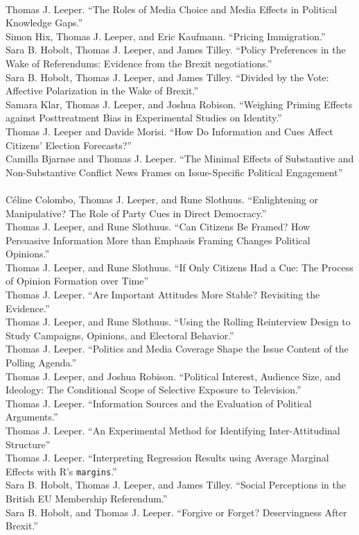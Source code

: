 \documentclass[12pt]{article}
\renewcommand{\section}[1]{\pagebreak[3]%
    \llap{\scshape\smash{\parbox[t]{\marginparwidth}{\raggedright {\color{lg}#1}}}}%
    \vspace{-\baselineskip}\par}
\newcommand{\topic}[1]{\pagebreak[3]\indent {\color{lg}{\footnotesize #1 }}\\}
\newcommand{\entry}[1]{\indent {\color{lg}\guillemotright}\hspace{2pt}#1\vspace{.25em}\\}
\begin{document}
\section{Working Papers\\ \& Ongoing Projects}
\topic{Papers Under Review}
	\entry{Thomas J. Leeper. ``The Roles of Media Choice and Media Effects in Political Knowledge Gaps.''}
    \entry{Simon Hix, Thomas J. Leeper, and Eric Kaufmann. ``Pricing Immigration.''}
    \entry{Sara B. Hobolt, Thomas J. Leeper, and James Tilley. ``Policy Preferences in the Wake of Referendums: Evidence from the Brexit negotiations.''}
    \entry{Sara B. Hobolt, Thomas J. Leeper, and James Tilley. ``Divided by the Vote: Affective Polarization in the Wake of Brexit.''}
    \entry{Samara Klar, Thomas J. Leeper, and Joshua Robison. ``Weighing Priming Effects against Posttreatment Bias in Experimental Studies on Identity.''}
	\entry{Thomas J. Leeper and Davide Morisi. ``How Do Information and Cues Affect Citizens' Election Forecasts?''}
    \entry{Camilla Bjarn{\o}e and Thomas J. Leeper. ``The Minimal Effects of Substantive and Non-Substantive Conflict News Frames on Issue-Specific Political Engagement''}

\topic{Working Papers}
	\entry{C\'{e}line Colombo, Thomas J. Leeper, and Rune Slothuus. ``Enlightening or Manipulative? The Role of Party Cues in Direct Democracy.''}
	\entry{Thomas J. Leeper, and Rune Slothuus. ``Can Citizens Be Framed? How Persuasive Information More than Emphasis Framing Changes Political Opinions.''}
	\entry{Thomas J. Leeper, and Rune Slothuus. ``If Only Citizens Had a Cue: The Process of Opinion Formation over Time''}
	\entry{Thomas J. Leeper. ``Are Important Attitudes More Stable? Revisiting the Evidence.''}
    \entry{Thomas J. Leeper, and Rune Slothuus. ``Using the Rolling Reinterview Design to Study Campaigns, Opinions, and Electoral Behavior.''}
	\entry{Thomas J. Leeper. ``Politics and Media Coverage Shape the Issue Content of the Polling Agenda.''}
	\entry{Thomas J. Leeper, and Joshua Robison. ``Political Interest, Audience Size, and Ideology: The Conditional Scope of Selective Exposure to Television.''}
    \entry{Thomas J. Leeper. ``Information Sources and the Evaluation of Political Arguments.''}
	\entry{Thomas J. Leeper. ``An Experimental Method for Identifying Inter-Attitudinal Structure''}
	\entry{Thomas J. Leeper. ``Interpreting Regression Results using Average Marginal Effects with R's \texttt{margins}.''}
    \entry{Sara B. Hobolt, Thomas J. Leeper, and James Tilley. ``Social Perceptions in the British EU Membership Referendum.''}
    \entry{Sara B. Hobolt, and Thomas J. Leeper. ``Forgive or Forget? Deservingness After Brexit.''}
\end{document}

